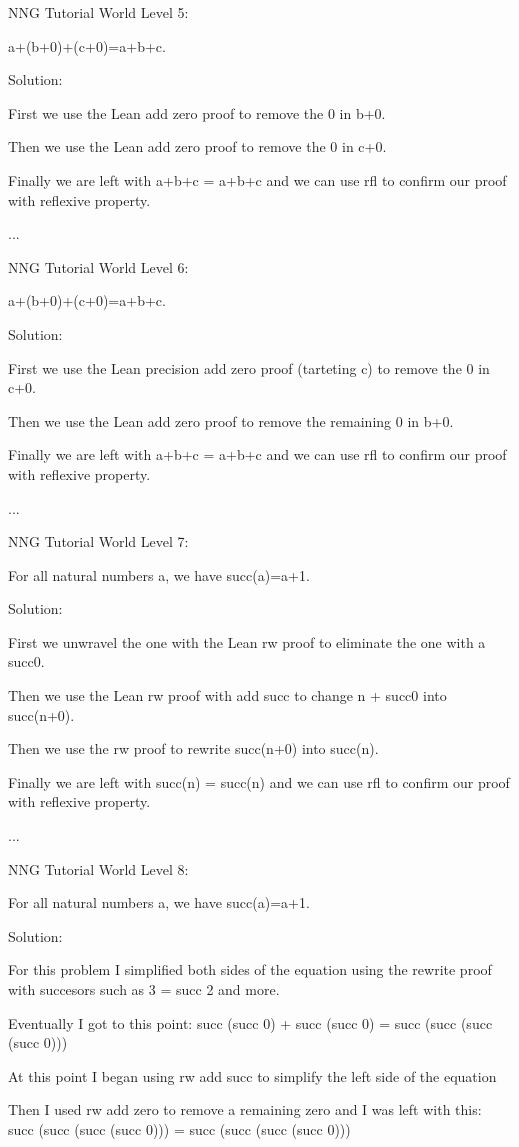 \documentclass{article}
\theoremstyle{theorem}
\theoremstyle{definition}
\theoremstyle{remark}
\begin{document}
NNG Tutorial World Level 5:

a+(b+0)+(c+0)=a+b+c.

Solution: 

First we use the Lean add zero proof to remove the 0 in b+0.

Then we use the Lean add zero proof to remove the 0 in c+0.

Finally we are left with a+b+c = a+b+c and we can use rfl to confirm our proof with reflexive property.

...

NNG Tutorial World Level 6:

a+(b+0)+(c+0)=a+b+c.

Solution: 

First we use the Lean precision add zero proof (tarteting c) to remove the 0 in c+0.

Then we use the Lean add zero proof to remove the remaining 0 in b+0.

Finally we are left with a+b+c = a+b+c and we can use rfl to confirm our proof with reflexive property.

...

NNG Tutorial World Level 7:

For all natural numbers a, we have succ(a)=a+1.

Solution: 

First we unwravel the one with the Lean rw proof to eliminate the one with a succ0.

Then we use the Lean rw proof with add succ to change n + succ0 into succ(n+0).

Then we use the rw proof to rewrite succ(n+0) into succ(n).

Finally we are left with succ(n) = succ(n) and we can use rfl to confirm our proof with reflexive property.

...

NNG Tutorial World Level 8:

For all natural numbers a, we have succ(a)=a+1.

Solution: 

For this problem I simplified both sides of the equation using the rewrite proof with succesors such as 3 = succ 2 and more.

Eventually I got to this point: succ (succ 0) + succ (succ 0) = succ (succ (succ (succ 0)))

At this point I began using rw add succ to simplify the left side of the equation

Then I used rw add zero to remove a remaining zero and I was left with this: succ (succ (succ (succ 0))) = succ (succ (succ (succ 0)))
\end{document}
